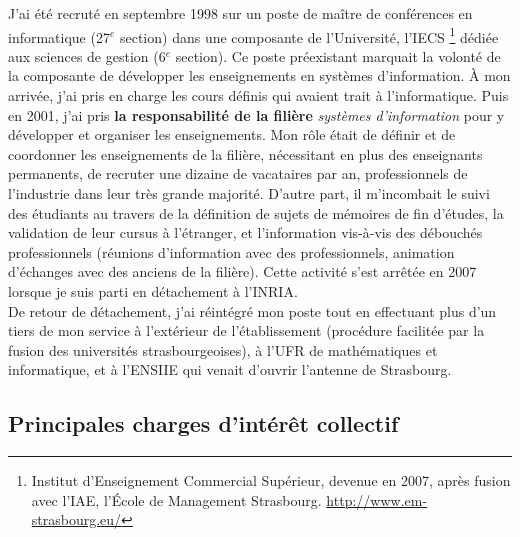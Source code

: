 \documentclass[11pt]{article}
\begin{document}
J'ai été recruté en septembre 1998 sur un poste de maître de conférences 
en informatique (27$^e$ section) dans une composante de l'Université, l'IECS%
\footnote{Institut d'Enseignement  Commercial Supérieur, devenue en  2007, après
  fusion        avec        l'IAE,         l'\'Ecole        de        Management
  Strasbourg. \url{http://www.em-strasbourg.eu/}} dédiée aux sciences de gestion
(6$^e$ section).  Ce  poste préexistant marquait la volonté de  la composante de
développer les  enseignements en systèmes  d'information. \`A mon  arrivée, j'ai
pris en  charge les cours définis  qui avaient trait à  l'informatique.  Puis en
2001,  j'ai  pris  \textbf{la  responsabilité de  la  filière}  \textit{systèmes
  d'information} pour  y développer  et organiser  les enseignements.   Mon rôle
était de définir  et de coordonner les enseignements de  la filière, nécessitant
en plus  des enseignants permanents, de  recruter une dizaine de  vacataires par
an, professionnels de l'industrie dans leur très grande majorité.  D'autre part,
il m'incombait le suivi  des étudiants au travers de la  définition de sujets de
mémoires  de  fin d'études,  la  validation  de  leur  cursus à  l'étranger,  et
l'information  vis-à-vis des  débouchés  professionnels (réunions  d'information
avec des professionnels,  animation d'échanges avec des anciens  de la filière).
Cette activité  s'est arrêtée  en 2007  lorsque je suis  parti en  détachement à
l'INRIA.\\

De retour de détachement, j'ai réintégré  mon poste tout en effectuant plus d'un
tiers de mon  service à l'extérieur de l'établissement  (procédure facilitée par
la  fusion  des  universités  strasbourgeoises), à  l'UFR  de  mathématiques  et
informatique, et à l'ENSIIE qui venait d'ouvrir l'antenne de Strasbourg.


\subsection{Principales charges d'intérêt collectif}
\end{document}
